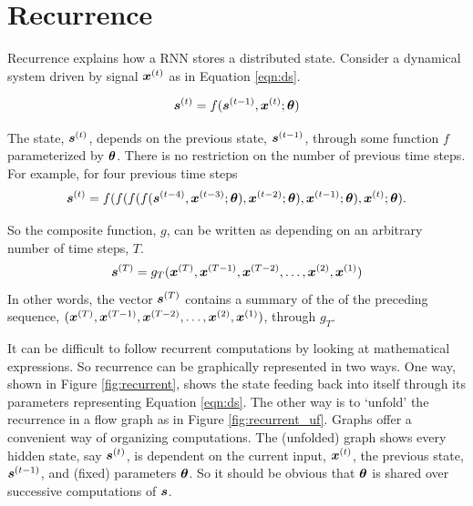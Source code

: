 
\section{Recurrence}

Recurrence explains how a RNN stores a distributed state. Consider a dynamical system driven by signal $\boldsymbol{x}^{(t)}$ as in Equation \ref{eqn:ds}.

\begin{equation}
  \boldsymbol{s}^{(t)} = f(\boldsymbol{s}^{(t-1)},\boldsymbol{x}^{(t)};\boldsymbol{\theta})
  \label{eqn:ds}
\end{equation}

The state, $\boldsymbol{s}\sp{(t)}$, depends on the previous state, $\boldsymbol{s}^{(t-1)}$, through some function $f$ parameterized by $\boldsymbol{\theta}$. There is no restriction on the number of previous time steps. For example, for four previous time steps
\begin{equation*}
\boldsymbol{s}\sp{(t)} = 
f(f(f(f(\boldsymbol{s}\sp{(t-4)}
,\boldsymbol{x}\sp{(t-3)};\boldsymbol{\theta})
,\boldsymbol{x}\sp{(t-2)};\boldsymbol{\theta})
,\boldsymbol{x}\sp{(t-1)};\boldsymbol{\theta})
,\boldsymbol{x}\sp{(t)};\boldsymbol{\theta})     .
\end{equation*}

So the composite function, $g$, can be written as depending on an arbitrary number of time steps, $T$.
\begin{equation*}
\boldsymbol{s}\sp{(T)} = g_{T}(\boldsymbol{x}\sp{(T)},\boldsymbol{x}\sp{(T-1)},\boldsymbol{x}\sp{(T-2)},\ldots,\boldsymbol{x}\sp{(2)},\boldsymbol{x}\sp{(1)})
\end{equation*}
In other words, the vector $\boldsymbol{s}\sp{(T)}$ contains a summary of the of the preceding sequence, $(\boldsymbol{x}\sp{(T)},\boldsymbol{x}\sp{(T-1)},\boldsymbol{x}\sp{(T-2)},\ldots,\boldsymbol{x}\sp{(2)},\boldsymbol{x}\sp{(1)})$, through $g_T$.

It can be difficult to follow recurrent computations by looking at mathematical expressions. So recurrence can be graphically represented in two ways. One way, shown in Figure \ref{fig:recurrent}, shows the state feeding back into itself through its parameters representing Equation \ref{eqn:ds}. The other way is to `unfold' the recurrence in a flow graph as in Figure \ref{fig:recurrent_uf}. Graphs offer a convenient way of organizing computations. The (unfolded) graph shows every hidden state, say $\boldsymbol{s}\sp{(t)}$, is dependent on the current input, $\boldsymbol{x}\sp{(t)}$, the previous state, $\boldsymbol{s}\sp{(t-1)}$, and (fixed) parameters $\boldsymbol{\theta}$. So it should be obvious that $\boldsymbol{\theta}$ is shared over successive computations of $\boldsymbol{s}$.

